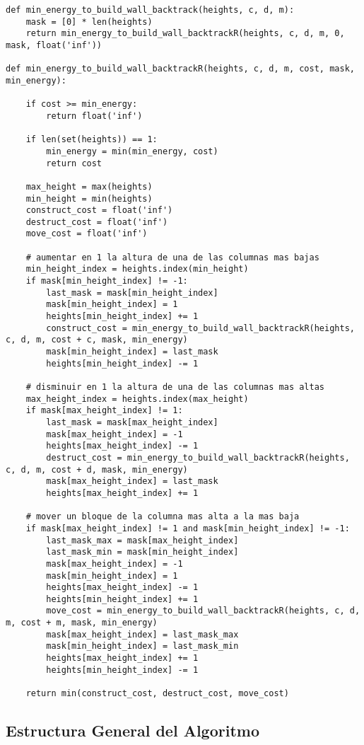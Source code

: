 \documentclass[a4paper,12pt]{article}
\begin{document}
\begin{lstlisting}
def min_energy_to_build_wall_backtrack(heights, c, d, m):
	mask = [0] * len(heights)
	return min_energy_to_build_wall_backtrackR(heights, c, d, m, 0, mask, float('inf'))

def min_energy_to_build_wall_backtrackR(heights, c, d, m, cost, mask, min_energy):

	if cost >= min_energy:
		return float('inf') 

	if len(set(heights)) == 1:
		min_energy = min(min_energy, cost)
		return cost

	max_height = max(heights)
	min_height = min(heights)
	construct_cost = float('inf')
	destruct_cost = float('inf')
	move_cost = float('inf')

	# aumentar en 1 la altura de una de las columnas mas bajas 
	min_height_index = heights.index(min_height)
	if mask[min_height_index] != -1:
		last_mask = mask[min_height_index]
		mask[min_height_index] = 1
		heights[min_height_index] += 1
		construct_cost = min_energy_to_build_wall_backtrackR(heights, c, d, m, cost + c, mask, min_energy)
		mask[min_height_index] = last_mask
		heights[min_height_index] -= 1

	# disminuir en 1 la altura de una de las columnas mas altas
	max_height_index = heights.index(max_height)
	if mask[max_height_index] != 1:
		last_mask = mask[max_height_index]
		mask[max_height_index] = -1
		heights[max_height_index] -= 1
		destruct_cost = min_energy_to_build_wall_backtrackR(heights, c, d, m, cost + d, mask, min_energy)
		mask[max_height_index] = last_mask
		heights[max_height_index] += 1

	# mover un bloque de la columna mas alta a la mas baja
	if mask[max_height_index] != 1 and mask[min_height_index] != -1:
		last_mask_max = mask[max_height_index]
		last_mask_min = mask[min_height_index]
		mask[max_height_index] = -1
		mask[min_height_index] = 1
		heights[max_height_index] -= 1
		heights[min_height_index] += 1
		move_cost = min_energy_to_build_wall_backtrackR(heights, c, d, m, cost + m, mask, min_energy)
		mask[max_height_index] = last_mask_max
		mask[min_height_index] = last_mask_min
		heights[max_height_index] += 1
		heights[min_height_index] -= 1

	return min(construct_cost, destruct_cost, move_cost)

\end{lstlisting}

\subsection{Estructura General del Algoritmo}
\end{document}
